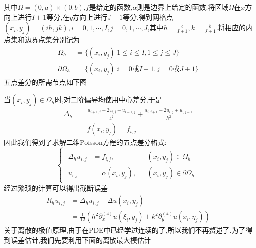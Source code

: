 其中$\Omega=(0,a)\times(0,b)$,$f$是给定的函数,$\alpha$则是边界上给定的函数.将区域$\Omega$在$x$方向上进行$I+1$等分,在$y$方向上进行$J+1$等分,得到网格点$(x_i,y_j)=(ih,jk),i=0,1,\cdots,I,j=0,1,\cdots,J$,其中$h=\frac{a}{I+1},k=\frac{b}{J+1}$.将相应的内点集和边界点集分别记为
$$
\begin{aligned}
\Omega_h&=\{(x_i,y_j)|1\leqslant i\leqslant I,1\leqslant j\leqslant J\}\\
\partial\Omega_h&=\{(x_i,y_j)|i=0\text{或}I+1,j=0\text{或}J+1\}
\end{aligned}
$$
五点差分的所需节点如下图
\begin{center}
\end{center}
当$(x_i,y_j)\in\Omega_h$时,对二阶偏导均使用中心差分,于是
$$
\begin{aligned}
    \Delta_h &= \frac{u_{i+1,j}-2u_{i,j}+u_{i-1,j}}{h^2} + \frac{u_{i,j+1}-2u_{i,j}+u_{i,j-1}}{h^2}\\
             &= f(x_i,y_j)=f_{i,j}
\end{aligned}
$$
因此我们得到了求解二维Poisson方程的五点差分格式:
$$
\begin{cases}
    \begin{alignedat}{2}
        \Delta_h u_{i,j}&= f_{i,j},&&(x_i,y_j)\in\Omega_h\\[3pt]
        u_{i,j}&=\alpha(x_i,y_j),&&(x_i,y_j)\in\partial\Omega_h
    \end{alignedat}
\end{cases}
$$
经过繁琐的计算可以得出截断误差
$$
\begin{aligned}
    R_{h}u_{i,j} &= \Delta_h u_{i,j} - \Delta u(x_i,y_j)\\
              &= \frac{1}{12}\left(h^2\partial^{(4)}_x u(\xi_i,y_j)+k^2\partial^{(4)}_y u(x_i,\eta_j)\right)
\end{aligned}
$$
关于离散的极值原理,由于在PDE中已经学过连续的了,所以我们不再赘述了.为了得到误差估计,我们先要利用下面的离散最大模估计
